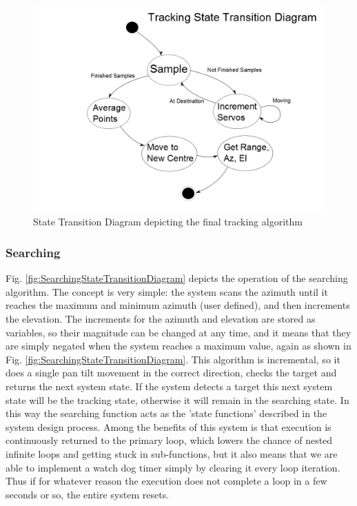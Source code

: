 \documentclass[]{report}
\begin{document}
\begin{figure}
\centering
\includegraphics[width=0.7\linewidth]{"../Diagrams/Tracking State Transition Diagram"}
\caption{State Transition Diagram depicting the final tracking algorithm}
\label{fig:TrackingStateTransitionDiagram}
\end{figure}

\subsubsection{Searching}
Fig. \ref{fig:SearchingStateTransitionDiagram} depicts the operation of the searching algorithm. The concept is very simple: the system scans the azimuth until it reaches the maximum and minimum azimuth (user defined), and then increments the elevation. The increments for the azimuth and elevation are stored as variables, so their magnitude can be changed at any time, and it means that they are simply negated when the system reaches a maximum value, again as shown in Fig. \ref{fig:SearchingStateTransitionDiagram}. This algorithm is incremental, so it does a single pan tilt movement in the correct direction, checks the target and returns the next system state. If the system detects a target this next system state will be the tracking state, otherwise it will remain in the searching state. In this way the searching function acts as the 'state functions' described in the system design process. \newline
Among the benefits of this system is that execution is continuously returned to the primary loop, which lowers the chance of nested infinite loops and getting stuck in sub-functions, but it also means that we are able to implement a watch dog timer simply by clearing it every loop iteration. Thus if for whatever reason the execution does not complete a loop in a few seconds or so, the entire system resets.
\end{document}
